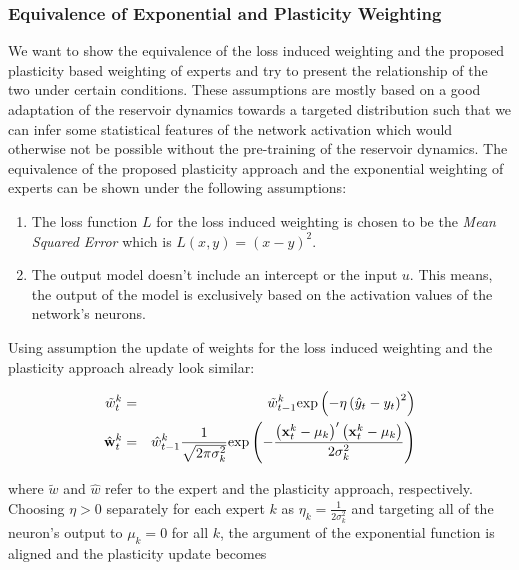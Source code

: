 \subsubsection{Equivalence of Exponential and Plasticity Weighting}
\label{CH:ExpertModels:Equivalence}
We want to show the equivalence of the loss induced weighting and the proposed plasticity based weighting of experts and try to present the relationship of the two under certain conditions. These assumptions are mostly based on a good adaptation of the reservoir dynamics towards a targeted distribution such that we can infer some statistical features of the network activation which would otherwise not be possible without the pre-training of the reservoir dynamics.
The equivalence of the proposed plasticity approach and the exponential weighting of experts can be shown under the following assumptions:

\begin{enumerate}
    \item The loss function $L$ for the loss induced weighting is chosen to be the \textit{Mean Squared Error} which is $L(x,y) = \left(x - y\right)^2$. \label{Assumption:Loss}
    \item The output model doesn't include an intercept or the input $u$. This means, the output of the model is exclusively based on the activation values of the network's neurons. \label{Assumption:OutputModel}
\end{enumerate}

Using assumption  the update of weights for the loss induced weighting  and the plasticity  approach already look similar:

\begin{eqnarray}
    \tilde w_t^k & = & \tilde w_{t-1}^{k}\text{exp}\left( -\eta \left(\hat y_t - y_t\right)^2 \right) \label{EQ:ExpertUpdateMSE}\\
    \hat {{\bf w}}_t^k & = & \hat w_{t-1}^{k} \frac{1}{\sqrt{2\pi\sigma_k^2}} \text{exp}\left( -\frac{\left({\bf x}^{k}_{t} - \mu_k\right)'\left({\bf x}^{k}_{t} - \mu_k\right)}{2\sigma_k^2} \right)
\end{eqnarray}

where $\tilde w$ and $\hat w$ refer to the expert and the plasticity approach, respectively. Choosing $\eta > 0$ separately for each expert $k$ as $\eta_k = \frac{1}{2\sigma_k^2}$ and targeting all of the neuron's output to $\mu_k = 0$ for all $k$, the argument of the exponential function is aligned and the plasticity update becomes

